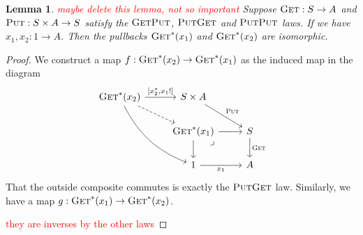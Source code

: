 \documentclass[11pt,a4paper]{article}
\theoremstyle{plain}
\newtheorem{lemma}[theorem]{Lemma}
\theoremstyle{definition}
\newcommand{\fget}{\textsc{Get}}
\newcommand{\fput}{\textsc{Put}}
\newcommand{\todo}[1]{\textcolor{red}{\small #1}}
\begin{document}
\begin{lemma}
\todo{maybe delete this lemma, not so important}
Suppose $\fget : S \to A$ and $\fput : S \times A \to S$ satisfy the $\fget\fput$, $\fput\fget$ and $\fput\fput$ laws. If we have $x_1, x_2 : 1 \to A$. Then the pullbacks $\fget^*(x_1)$ and $\fget^*(x_2)$ are isomorphic.
\end{lemma}
\begin{proof}
We construct a map $f : \fget^*(x_2) \to \fget^*(x_1)$ as the induced map in the diagram
\[
\begin{tikzcd}
\fget^*(x_2) \ar[ddr, bend right = 20] \ar[dr, dashed] \ar[r, "{[x_2^*, x_1 !]}"] & S \times A \ar[dr, "\fput"] & \\
& \fget^*(x_1) \ar[r, swap] \ar[d] \arrow[dr, phantom, "\lrcorner", very near start] & S \ar[d, "\fget"] \\
& 1\ar[r, "x_1", swap] & A
\end{tikzcd}
\]
That the outside composite commutes is exactly the $\fput\fget$ law. Similarly, we have a map $g : \fget^*(x_1) \to \fget^*(x_2)$.

\todo{they are inverses by the other laws}
\end{proof}
\end{document}
